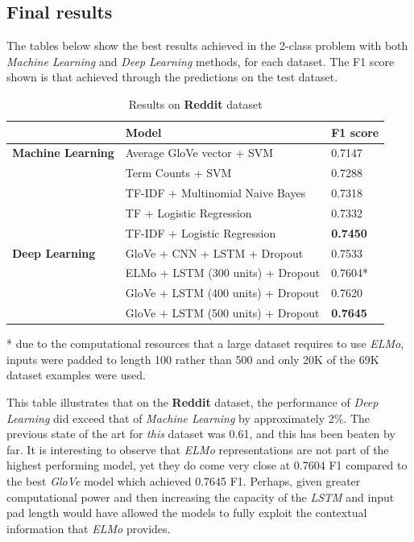 \documentclass[12pt,a4paper]{article}
\begin{document}


\subsection{Final results}
The tables below show the best results achieved in the 2-class problem with both \textit{Machine Learning} and \textit{Deep Learning} methods, for each dataset. The F1 score shown is that achieved through the predictions on the test dataset.

\begin{table}[H]
	\centering
	\vspace*{-18pt}
	\caption{Results on \textbf{Reddit} dataset}
	\label{results1}
	\hspace*{-0.8cm}
	\begin{tabular}{p{3.4cm} p{10cm} p{3cm}} \hline\hline
		& \textbf{Model} & \textbf{F1 score}  \\ \hline
		
		\textbf{Machine Learning} & Average GloVe vector + SVM & 0.7147 \\
		& Term Counts + SVM & 0.7288 \\
		& TF-IDF + Multinomial Naive Bayes & 0.7318 \\ 
		& TF + Logistic Regression & 0.7332 \\
		& TF-IDF + Logistic Regression & \textbf{0.7450} \\ \hline
		
		\textbf{Deep Learning} & GloVe + CNN + LSTM + Dropout & 0.7533 \\
		& ELMo + LSTM (300 units) + Dropout & 0.7604* \\
		& GloVe + LSTM (400 units) + Dropout & 0.7620 \\
		& GloVe + LSTM (500 units) + Dropout & \textbf{0.7645} \\ \hline
	\end{tabular}
\end{table}

* due to the computational resources that a large dataset requires to use \textit{ELMo}, inputs were padded to length 100 rather than 500 and only 20K of the 69K dataset examples were used. \newline

This table illustrates that on the \textbf{Reddit} dataset, the performance of \textit{Deep Learning} did exceed that of \textit{Machine Learning} by approximately 2\%. The previous state of the art for \textit{this} dataset was 0.61, and this has been beaten by far. It is interesting to observe that \textit{ELMo} representations are not part of the highest performing model, yet they do come very close at 0.7604 F1 compared to the best \textit{GloVe} model which achieved 0.7645 F1. Perhaps, given greater computational power and then increasing the capacity of the \textit{LSTM} and input pad length would have allowed the models to fully exploit the contextual information that \textit{ELMo} provides.
\end{document}
